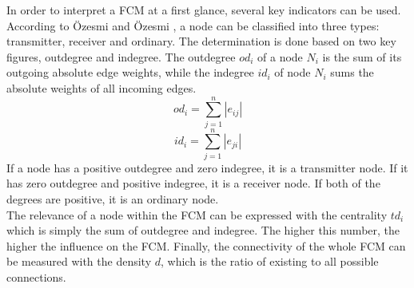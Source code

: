 \documentclass[conference]{IEEEtran}
\begin{document}
In order to interpret a FCM at a first glance, several key indicators can be used. According to \"Ozesmi and \"Ozesmi \cite{ozesmi2004}, a node can be classified into three types: transmitter, receiver and ordinary. The determination is done based on two key figures, outdegree and indegree. The outdegree \begin{math} od_{i} \end{math} of a node \begin{math} N_{i} \end{math} is the sum of its outgoing absolute edge weights, while the indegree \begin{math} id_{i} \end{math} of node \begin{math} N_{i} \end{math} sums the absolute weights of all incoming edges.\\
\begin{equation}
od_{i} = \sum_{j=1}^{n}|e_{ij}|
\end{equation}
\begin{equation}
id_{i} = \sum_{j=1}^{n}|e_{ji}|
\end{equation}
If a node has a positive outdegree and zero indegree, it is a transmitter node. If it has zero outdegree and positive indegree, it is a receiver node. If both of the degrees are positive, it is an ordinary node.\\
The relevance of a node within the FCM can be expressed with the centrality \begin{math}td_{i} \end{math} which is simply the sum of outdegree and indegree. The higher this number, the higher the influence on the FCM. Finally, the connectivity of the whole FCM can be measured with the density \begin{math} d \end{math}, which is the ratio of existing to all possible connections.\\
\end{document}
